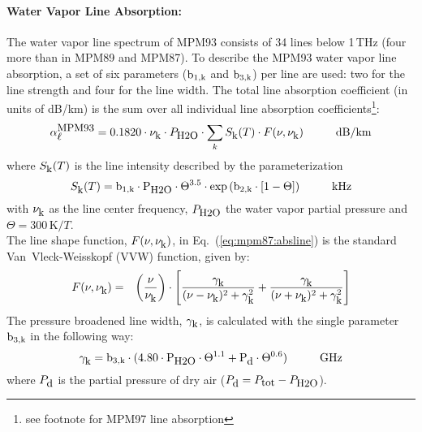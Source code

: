 \paragraph{Water Vapor Line Absorption:}
\label{levele:mpm93_h2olines}
The water vapor line spectrum of MPM93 \citep{liebeetal:93} 
consists of 34 lines below 1\,THz (four more than in MPM89 and MPM87). 
To describe the MPM93 water vapor line absorption, a set of six parameters 
($\rm b_{\rm 1,k}$ and $\rm b_{\rm 3,k}$) per line are used: two for the line strength and 
four for the line width. The total line absorption coefficient 
(in units of dB/km) is the sum over all individual line absorption 
coefficients\footnote{see footnote for MPM97 line absorption}:
\begin{equation}
  \label{eq:mpm93:absline}
  \alphampmnl = 0.1820 \cdot \nuk \cdot \phzo \cdot 
  \sum_{k}{\inten \cdot \shape}\hspace*{10mm}\mbox{dB/km}
\end{equation}
where $S_{\mbox{\rm \small k}}(T)$ is the line intensity described by the parameterization
\begin{equation}
  \label{eq:mpm93:strength}
  \inten = \bek \cdot \phzo \cdot \Theta^{3.5} 
           \cdot \exp{(\bzk \cdot [1-\Theta])}\hspace*{10mm}\mbox{kHz}
\end{equation}
with $\nu_{\mbox{\rm \small k}}$ as the line center frequency, $P_{\mbox{\rm \small H2O}}$ the water
vapor partial pressure and $\Theta = 300\,\mbox{K}/T$.\\
The line shape function, $F(\nu,\nu_{\mbox{\rm \small k}})$, in Eq.~(\ref{eq:mpm87:absline}) 
is the standard Van~Vleck-Weisskopf (VVW) function, given by:
\begin{eqnarray}
  \label{eq:mpm93:VVW}
  F(\nu,\nu_{\mbox{\rm \small k}}) & = & \left(\frac{\nu}{\nu_{\mbox{\rm \small k}}}\right) \cdot 
               \left[\frac{\gamma_{\mbox{\rm \small k}}}{(\nu - \nu_{\mbox{\rm \small k}})^2 + \gamma_{\mbox{\rm \small k}}^2} + 
                     \frac{\gamma_{\mbox{\rm \small k}}}{(\nu + \nu_{\mbox{\rm \small k}})^2 + \gamma_{\mbox{\rm \small k}}^2}\right]\\
\end{eqnarray}
The pressure broadened line width, $\gamma_{\mbox{\rm \small k}}$, is calculated with the 
single parameter $\rm b_{\rm 3,k}$ in the following way:
\begin{equation}
  \label{eq:mpm93:gamma}
  \gamk = \bdk \cdot 
          (4.80 \cdot \phzo \cdot \Theta^{1.1} + \pda \cdot
          \Theta^{0.6})\hspace*{10mm}\mbox{GHz}
\end{equation}
where $P_{\mbox{\rm \small d}}$ is the partial pressure of dry air ($P_{\mbox{\rm \small d}}=P_{\mbox{\rm \small tot}}-P_{\mbox{\rm \small H2O}}$). 

